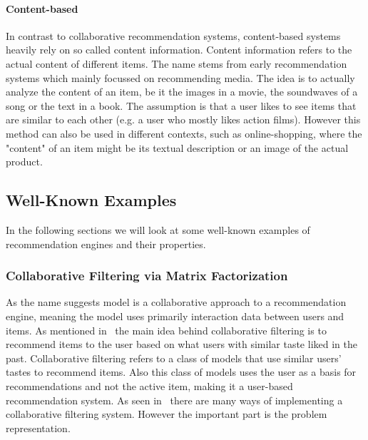 \paragraph{Content-based}
In contrast to collaborative recommendation systems, content-based systems heavily rely on so called content information.
Content information refers to the actual content of different items.
The name stems from early recommendation systems which mainly focussed on recommending media.
The idea is to actually analyze the content of an item, be it the images in a movie, the soundwaves of a song or the text in a book.
The assumption is that a user likes to see items that are similar to each other (e.g. a user who mostly likes action films).
However this method can also be used in different contexts, such as online-shopping, where the "content" of an item might be its textual description or an image of the actual product.
\subsection{Well-Known Examples}
In the following sections we will look at some well-known examples of recommendation engines and their properties.
\subsubsection{Collaborative Filtering via Matrix Factorization}
As the name suggests model is a collaborative approach to a recommendation engine, meaning the model uses primarily interaction data between users and items.
As mentioned in~\cite{intro_recsys} the main idea behind collaborative filtering is to recommend items to the user based on what users with similar taste liked in the past.
Collaborative filtering refers to a class of models that use similar users' tastes to recommend items.
Also this class of models uses the user as a basis for recommendations and not the active item, making it a user-based recommendation system.
As seen in~\cite{collaborative_filtering} there are many ways of implementing a collaborative filtering system.
However the important part is the problem representation.


